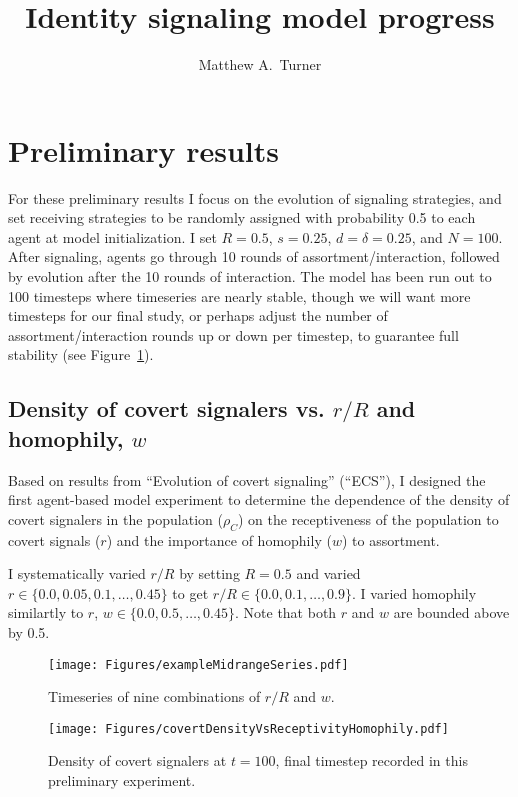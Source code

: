 \documentclass[11pt,letterpaper]{article}
\title{Identity signaling model progress}
\author{{Matthew A.~Turner}}
\begin{document}
\maketitle

\section*{Preliminary results}

For these preliminary results I focus on the evolution of signaling strategies,
and set receiving strategies to be randomly assigned with probability 0.5 to
each agent at model initialization. I set $R=0.5$, $s=0.25$, $d=\delta=0.25$,
and $N=100$. After signaling, agents go through 10 rounds of assortment/interaction,
followed by evolution after the 10 rounds of interaction. The model has been
run out to 100 timesteps where timeseries are nearly stable, though we will
want more timesteps for our final study, or perhaps adjust the number of 
assortment/interaction rounds up or down per timestep, to guarantee full 
stability (see Figure~\ref{fig:exampleSeries}).

\subsection*{Density of covert signalers vs. $r/R$ and homophily, $w$}

Based on results from ``Evolution of covert signaling'' (``ECS''), I designed
the first agent-based model experiment to determine the dependence of the
density of covert signalers in the population ($\rho_C$) on
the receptiveness of the population to covert signals ($r$) and the
importance of homophily ($w$) to assortment. 

I systematically varied $r/R$ by setting $R=0.5$ and varied 
$r \in \{0.0, 0.05, 0.1, \ldots, 0.45\}$ to get $r/R \in \{0.0, 0.1, \ldots, 0.9\}$.
I varied homophily similartly to $r$, $w \in \{0.0, 0.5, \ldots, 0.45\}$. Note
that both $r$ and $w$ are bounded above by 0.5.


\begin{figure}[H]
  \centering
  \texttt{[image: Figures/exampleMidrangeSeries.pdf]}
  \caption{Timeseries of nine combinations of $r/R$ and $w$.}
  \label{fig:exampleSeries}
\end{figure}


\begin{figure}[H]
  \centering
\texttt{[image: Figures/covertDensityVsReceptivityHomophily.pdf]}
  \caption{Density of covert signalers at $t=100$, final timestep recorded
    in this preliminary experiment.}
  \label{fig:}
\end{figure}
\end{document}
